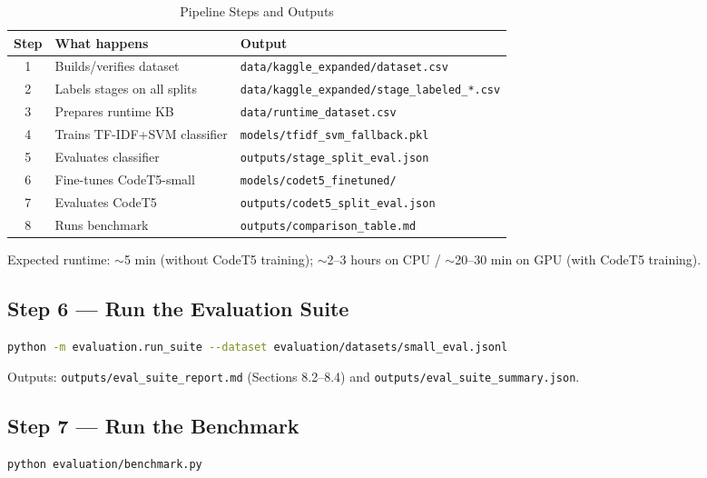 \documentclass[12pt,a4paper]{article}
\begin{document}
\begin{table}[h!]
\centering
\caption{Pipeline Steps and Outputs}
\small
\begin{tabular}{clp{5cm}}
\toprule
Step & What happens & Output \\
\midrule
1 & Builds/verifies dataset & \texttt{data/kaggle\_expanded/dataset.csv} \\
2 & Labels stages on all splits & \texttt{data/kaggle\_expanded/stage\_labeled\_*.csv} \\
3 & Prepares runtime KB & \texttt{data/runtime\_dataset.csv} \\
4 & Trains TF-IDF+SVM classifier & \texttt{models/tfidf\_svm\_fallback.pkl} \\
5 & Evaluates classifier & \texttt{outputs/stage\_split\_eval.json} \\
6 & Fine-tunes CodeT5-small & \texttt{models/codet5\_finetuned/} \\
7 & Evaluates CodeT5 & \texttt{outputs/codet5\_split\_eval.json} \\
8 & Runs benchmark & \texttt{outputs/comparison\_table.md} \\
\bottomrule
\end{tabular}
\end{table}

Expected runtime: $\sim$5 min (without CodeT5 training); $\sim$2--3 hours on CPU / $\sim$20--30 min on GPU (with CodeT5 training).

\subsection{Step 6 --- Run the Evaluation Suite}

\begin{lstlisting}[language=bash]
python -m evaluation.run_suite --dataset evaluation/datasets/small_eval.jsonl
\end{lstlisting}

Outputs: \texttt{outputs/eval\_suite\_report.md} (Sections 8.2--8.4) and \texttt{outputs/eval\_suite\_summary.json}.

\subsection{Step 7 --- Run the Benchmark}

\begin{lstlisting}[language=bash]
python evaluation/benchmark.py
\end{lstlisting}
\end{document}
